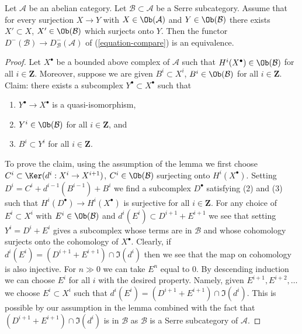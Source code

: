 \begin{lemma}
\label{lemma-fully-faithful-embedding}
Let $\mathcal{A}$ be an abelian category. Let $\mathcal{B} \subset \mathcal{A}$
be a Serre subcategory. Assume that for every surjection $X \to Y$
with $X \in \Ob(\mathcal{A})$ and $Y \in \Ob(\mathcal{B})$ there exists
$X' \subset X$, $X' \in \Ob(\mathcal{B})$ which surjects onto $Y$.
Then the functor $D^-(\mathcal{B}) \to D^-_\mathcal{B}(\mathcal{A})$ of
(\ref{equation-compare}) is an equivalence.
\end{lemma}

\begin{proof}
Let $X^\bullet$ be a bounded above complex of $\mathcal{A}$ such that
$H^i(X^\bullet) \in \Ob(\mathcal{B})$ for all $i \in \mathbf{Z}$.
Moreover, suppose we are given $B^i \subset X^i$, $B^i \in \Ob(\mathcal{B})$
for all $i \in \mathbf{Z}$. Claim: there exists a subcomplex
$Y^\bullet \subset X^\bullet$ such that
\begin{enumerate}
\item $Y^\bullet \to X^\bullet$ is a quasi-isomorphism,
\item $Y^i \in \Ob(\mathcal{B})$ for all $i \in \mathbf{Z}$, and
\item $B^i \subset Y^i$ for all $i \in \mathbf{Z}$.
\end{enumerate}
To prove the claim, using the assumption of the lemma we first choose
$C^i \subset \Ker(d^i : X^i \to X^{i + 1})$, $C^i \in \Ob(\mathcal{B})$
surjecting onto $H^i(X^\bullet)$. Setting
$D^i = C^i + d^{i - 1}(B^{i - 1}) + B^i$ we find a subcomplex
$D^\bullet$ satisfying (2) and (3) such that
$H^i(D^\bullet) \to H^i(X^\bullet)$ is surjective for all $i \in \mathbf{Z}$.
For any choice of $E^i \subset X^i$ with $E^i \in \Ob(\mathcal{B})$ and
$d^i(E^i) \subset D^{i + 1} + E^{i + 1}$ we see that setting
$Y^i = D^i + E^i$ gives a subcomplex whose terms are in $\mathcal{B}$ and
whose cohomology surjects onto the cohomology of $X^\bullet$. Clearly, if
$d^i(E^i) = (D^{i + 1} + E^{i + 1}) \cap \Im(d^i)$ then we see that
the map on cohomology is also injective. For $n \gg 0$ we can
take $E^n$ equal to $0$. By descending induction
we can choose $E^i$ for all $i$ with the desired property.
Namely, given $E^{i + 1}, E^{i + 2}, \ldots$ we choose $E^i \subset X^i$
such that $d^i(E^i) = (D^{i + 1} + E^{i + 1}) \cap \Im(d^i)$.
This is possible by our assumption in the lemma combined with
the fact that $(D^{i + 1} + E^{i + 1}) \cap \Im(d^i)$ is
in $\mathcal{B}$ as $\mathcal{B}$ is a Serre subcategory of $\mathcal{A}$.


\end{proof}

